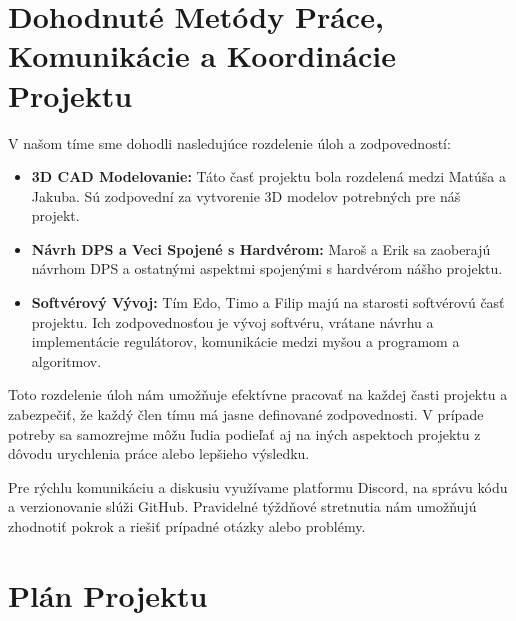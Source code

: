\section{Dohodnuté Metódy Práce, Komunikácie a Koordinácie Projektu}
V našom tíme sme dohodli nasledujúce rozdelenie úloh a zodpovedností:

\begin{itemize}
    \item \textbf{3D CAD Modelovanie:} Táto časť projektu bola rozdelená medzi Matúša a Jakuba. Sú zodpovední za vytvorenie 3D modelov potrebných pre náš projekt.
    
    \item \textbf{Návrh DPS a Veci Spojené s Hardvérom:} Maroš a Erik sa zaoberajú návrhom DPS a ostatnými aspektmi spojenými s hardvérom nášho projektu.
    
    \item \textbf{Softvérový Vývoj:} Tím Edo, Timo a Filip majú na starosti softvérovú časť projektu. Ich zodpovednosťou je vývoj softvéru, vrátane návrhu a implementácie regulátorov, komunikácie medzi myšou a programom a algoritmov.
\end{itemize}

Toto rozdelenie úloh nám umožňuje efektívne pracovať na každej časti projektu a zabezpečiť, že každý člen tímu má jasne definované zodpovednosti. V prípade potreby sa samozrejme môžu ľudia podieľať aj na iných aspektoch projektu z dôvodu urychlenia práce alebo lepšieho výsledku. 

Pre rýchlu komunikáciu a diskusiu využívame platformu Discord, na správu kódu a verzionovanie slúži GitHub. Pravidelné týždňové stretnutia nám umožňujú zhodnotiť pokrok a riešiť prípadné otázky alebo problémy.

\section{Plán Projektu}

